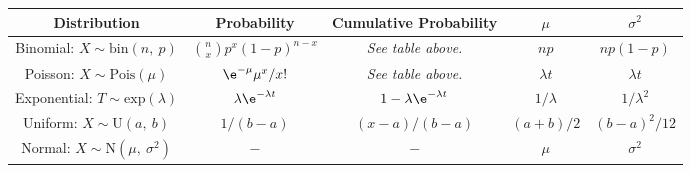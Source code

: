 \documentclass{article}
\begin{document}
\begin{table}[H]
    \centering
    \begin{tabular}{c | c | c | c | c}
        \toprule
        \textbf{Distribution}                                    & \textbf{Probability}                            & \textbf{Cumulative Probability}         & $\mu$                  & $\sigma^2$                \\
        \midrule
        Binomial: $X\sim \mathrm{bin}\left( n,\: p \right)$      & $\binom{n}{x} p^x \left( 1 - p \right)^{n - x}$ & \emph{See table above.}                 & $np$                   & $np\left( 1-p \right)$    \\
        Poisson: $X\sim \mathrm{Pois}\left( \mu \right)$         & $\e^{-\mu}\mu^x/x!$                             & \emph{See table above.}                 & $\lambda t$            & $\lambda t$               \\
        Exponential: $T\sim \mathrm{exp}\left( \lambda \right)$  & $\lambda \e^{-\lambda t}$                       & $1 - \lambda \e^{-\lambda t}$           & $1/\lambda$            & $1/\lambda^2$             \\
        Uniform: $X\sim \mathrm{U}\left( a,\: b \right)$         & $1/\left( b-a \right)$                          & $\left( x-a \right)/\left( b-a \right)$ & $\left( a+b \right)/2$ & $\left( b-a \right)^2/12$ \\
        Normal: $X\sim \mathrm{N}\left( \mu,\: \sigma^2 \right)$ & $-$                                             & $-$                                     & $\mu$                  & $\sigma^2$                \\
        \bottomrule
    \end{tabular}
\end{table}
\end{document}
